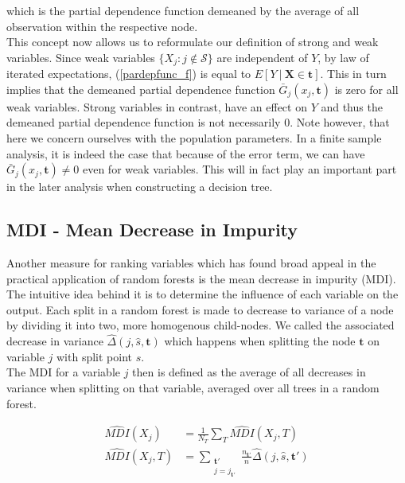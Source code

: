 which is the partial dependence function demeaned by the average of all observation within the respective node. \\

This concept now allows us to reformulate our definition of strong and weak variables.
Since weak variables $\{X_j : j \notin \mathcal{S}\}$ are independent of $Y$, by law of iterated expectations, (\ref{pardepfunc_f}) is equal to $E [Y \ | \ \mathbf{X} \in \mathbf{t}]$.
This in turn implies that the demeaned partial dependence function $\bar{G}_j(x_j, \mathbf{t})$ is zero for all weak variables.
Strong variables in contrast, have an effect on $Y$ and thus the demeaned partial dependence function is not necessarily 0. 
Note however, that here we concern ourselves with the population parameters. 
In a finite sample analysis, it is indeed the case that because of the error term, we can have $\bar{G}_j(x_j, \mathbf{t}) \neq 0$ even for weak variables. 
This will in fact play an important part in the later analysis when constructing a decision tree. 

\subsection{MDI - Mean Decrease in Impurity}

Another measure for ranking variables which has found broad appeal in the practical application of random forests is the mean decrease in impurity (MDI). 
The intuitive idea behind it is to determine the influence of each variable on the output. 
Each split in a random forest is made to decrease to variance of a node by dividing it into two, more homogenous child-nodes. 
We called the associated decrease in variance $\hat{\Delta}(j, \hat{s}, \mathbf{t})$ which happens when splitting the node $\mathbf{t}$ on variable $j$ with split point $s$. \\
The MDI for a variable $j$ then is defined as the average of all decreases in variance when splitting on that variable, averaged over all trees in a random forest.

\begin{align}
    \widehat{MDI}(X_j) &= \frac{1}{N_T} \sum_T \widehat{MDI}(X_j, T) \nonumber \\
    \widehat{MDI}(X_j, T) &= \sum_{\substack{\mathbf{t'} \\ j = j_{\mathbf{t'}}}} \frac{n_{\mathbf{t'}}}{n} \hat{\Delta}(j, \hat{s}, \mathbf{t'}) \label{MDI_nogood}
\end{align}

